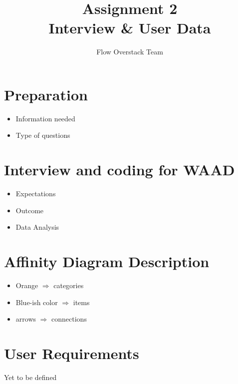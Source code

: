\documentclass[12pt]{scrartcl}
\title{Assignment 2\\ Interview \& User Data}
\author{Flow Overstack Team}
\date{}
\begin{document}
\maketitle

\section*{Preparation}

\begin{itemize}
\item Information needed
\item Type of questions
\end{itemize}

\section*{Interview and coding for WAAD}

\begin{itemize}
\item Expectations
\item Outcome
\item Data Analysis
\end{itemize}

\begin{figure}
\centering


\end{figure}

\section*{Affinity Diagram Description}

\begin{itemize}
\item Orange $\Rightarrow$ categories
\item Blue-ish color $\Rightarrow$ items
\item arrows $\Rightarrow$ connections
\end{itemize}

\section*{User Requirements}

Yet to be defined
\end{document}
